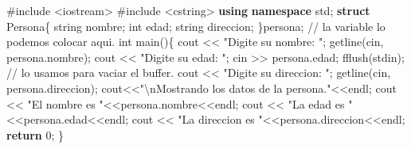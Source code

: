 \documentclass[
  11pt,
  a4paper,
  DIV=11,
  numbers=noendperiod]{scrreprt}
\newenvironment{Shaded}{\begin{snugshade}}{\end{snugshade}}
\newcommand{\CommentTok}[1]{\textcolor[rgb]{0.37,0.37,0.37}{#1}}
\newcommand{\ControlFlowTok}[1]{\textcolor[rgb]{0.00,0.23,0.31}{\textbf{#1}}}
\newcommand{\DataTypeTok}[1]{\textcolor[rgb]{0.68,0.00,0.00}{#1}}
\newcommand{\DecValTok}[1]{\textcolor[rgb]{0.68,0.00,0.00}{#1}}
\newcommand{\ImportTok}[1]{\textcolor[rgb]{0.00,0.46,0.62}{#1}}
\newcommand{\KeywordTok}[1]{\textcolor[rgb]{0.00,0.23,0.31}{\textbf{#1}}}
\newcommand{\NormalTok}[1]{\textcolor[rgb]{0.00,0.23,0.31}{#1}}
\newcommand{\OperatorTok}[1]{\textcolor[rgb]{0.37,0.37,0.37}{#1}}
\newcommand{\PreprocessorTok}[1]{\textcolor[rgb]{0.68,0.00,0.00}{#1}}
\newcommand{\SpecialCharTok}[1]{\textcolor[rgb]{0.37,0.37,0.37}{#1}}
\newcommand{\StringTok}[1]{\textcolor[rgb]{0.13,0.47,0.30}{#1}}
\begin{document}
\begin{Shaded}
\begin{Highlighting}[]
\PreprocessorTok{\#include }\ImportTok{\textless{}iostream\textgreater{}}
\PreprocessorTok{\#include }\ImportTok{\textless{}cstring\textgreater{}}
\KeywordTok{using} \KeywordTok{namespace}\NormalTok{ std}\OperatorTok{;}
\KeywordTok{struct}\NormalTok{ Persona}\OperatorTok{\{}
\NormalTok{    string nombre}\OperatorTok{;}
    \DataTypeTok{int}\NormalTok{ edad}\OperatorTok{;}
\NormalTok{    string direccion}\OperatorTok{;}
\OperatorTok{\}}\NormalTok{persona}\OperatorTok{;} \CommentTok{// la variable lo podemos colocar aqui.}
\DataTypeTok{int}\NormalTok{ main}\OperatorTok{()\{}
\NormalTok{    cout }\OperatorTok{\textless{}\textless{}} \StringTok{"Digite su nombre: "}\OperatorTok{;}
\NormalTok{    getline}\OperatorTok{(}\NormalTok{cin}\OperatorTok{,}\NormalTok{ persona}\OperatorTok{.}\NormalTok{nombre}\OperatorTok{);}
\NormalTok{    cout }\OperatorTok{\textless{}\textless{}} \StringTok{"Digite su edad: "}\OperatorTok{;}
\NormalTok{    cin }\OperatorTok{\textgreater{}\textgreater{}}\NormalTok{ persona}\OperatorTok{.}\NormalTok{edad}\OperatorTok{;}
\NormalTok{    fflush}\OperatorTok{(}\NormalTok{stdin}\OperatorTok{);} \CommentTok{// lo usamos para vaciar el buffer.}
\NormalTok{    cout }\OperatorTok{\textless{}\textless{}} \StringTok{"Digite su direccion: "}\OperatorTok{;}
\NormalTok{    getline}\OperatorTok{(}\NormalTok{cin}\OperatorTok{,}\NormalTok{ persona}\OperatorTok{.}\NormalTok{direccion}\OperatorTok{);}
\NormalTok{    cout}\OperatorTok{\textless{}\textless{}}\StringTok{"}\SpecialCharTok{\textbackslash{}n}\StringTok{Mostrando los datos de la persona."}\OperatorTok{\textless{}\textless{}}\NormalTok{endl}\OperatorTok{;}
\NormalTok{    cout }\OperatorTok{\textless{}\textless{}} \StringTok{"El nombre es "}\OperatorTok{\textless{}\textless{}}\NormalTok{persona}\OperatorTok{.}\NormalTok{nombre}\OperatorTok{\textless{}\textless{}}\NormalTok{endl}\OperatorTok{;}
\NormalTok{    cout }\OperatorTok{\textless{}\textless{}} \StringTok{"La edad es "}\OperatorTok{\textless{}\textless{}}\NormalTok{persona}\OperatorTok{.}\NormalTok{edad}\OperatorTok{\textless{}\textless{}}\NormalTok{endl}\OperatorTok{;}
\NormalTok{    cout }\OperatorTok{\textless{}\textless{}} \StringTok{"La direccion es "}\OperatorTok{\textless{}\textless{}}\NormalTok{persona}\OperatorTok{.}\NormalTok{direccion}\OperatorTok{\textless{}\textless{}}\NormalTok{endl}\OperatorTok{;}
    \ControlFlowTok{return} \DecValTok{0}\OperatorTok{;}
\OperatorTok{\}}
\end{Highlighting}
\end{Shaded}
\end{document}
